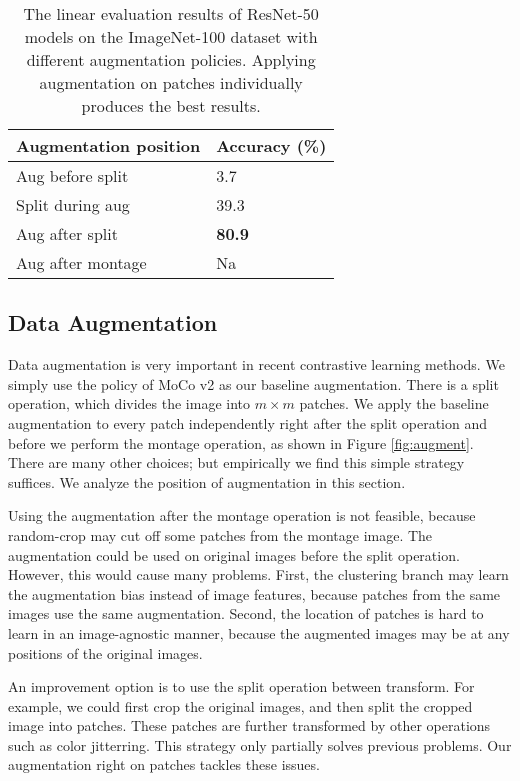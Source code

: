 \documentclass[final]{cvpr}
\begin{document}
\begin{table}
	\centering
	\begin{tabular}{l l}
		\toprule
		Augmentation position & Accuracy (\%) \\
		\midrule
		Aug before split & 3.7 \\	
		Split during aug & 39.3 \\
		Aug after split & \textbf{80.9} \\
		Aug after montage & Na \\
		\bottomrule
	\end{tabular}
	\vspace{0.1in}
	\caption{The linear evaluation results of ResNet-50 models on the ImageNet-100 dataset with different augmentation policies. Applying augmentation on patches individually produces the best results.}
	\label{tab:augment}
\end{table}

\subsection{Data Augmentation}
Data augmentation is very important in recent contrastive learning methods. We simply use the policy of MoCo v2 as our baseline augmentation. There is a split operation, which divides the image into $m\times m$ patches. We apply the baseline augmentation to every patch independently right after the split operation and before we perform the montage operation, as shown in Figure \ref{fig:augment}.
There are many other choices; but empirically we find this simple strategy suffices. We analyze the position of augmentation in this section. 

Using the augmentation after the montage operation is not feasible, because random-crop may cut off some patches from the montage image. 
The augmentation could be used on original images before the split operation. However, this would cause many problems. First, the clustering branch may learn the augmentation bias instead of image features, because patches from the same images use the same augmentation. Second, the location of patches is hard to learn in an image-agnostic manner, because the augmented images may be at any positions of the original images.
 
An improvement option is to use the split operation between transform. For example, we could first crop the original images, and then split the cropped image into patches. These patches are further transformed by other operations such as color jitterring. This strategy only partially solves previous problems. Our augmentation right on patches tackles these issues.
\end{document}
